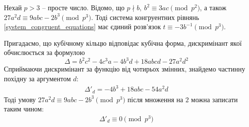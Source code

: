 \documentclass{thesis}
\begin{document}
\begin{lemma}
\label{system_when_p_is_prime_and_bigger_than_three}
Нехай $p > 3$ -- просте число. Відомо, що $p \nmid b,\ b^2 \equiv 3ac \pmod {p^2}$, а також $27a^2d \equiv 9abc - 2b^3 \pmod {p^3}$. Тоді система конгруентних рівнянь \eqref{system_congruent_equations} має єдиний розв'язок $t \equiv -3 b^{-1} \pmod {p^3}$.
\end{lemma}

Пригадаємо, що кубічному кільцю відповідає кубічна форма, дискримінант якої обчислюється за формулою
\begin{equation}
\Delta = b^2 c^2 - 4c^3 a - 4 b^3 d + 18 abcd - 27a^2d^2
\end{equation}
Сприймаючи дискримінант за функцію від чотирьох змінних, знайдемо частинну похідну за аргументом $d$:
\begin{align*}
\Delta'_d = -4b^3 + 18 abc - 54a^2 d
\end{align*}
Тоді умову $27a^2d \equiv 9abc - 2b^3 \pmod {p^3}$ після множення на $2$ можна записати таким чином:
\begin{align*}
\Delta'_d \equiv 0 \pmod {p^3}
\end{align*}

\iffalse
Розпишемо матриці $[\omega_1],\ [\omega_2]$ оператора множення. Для множення на $\omega_1$ маємо
\begin{align*}
\omega_1 \cdot 1 = \omega_1 = 0 \cdot 1 + 1 \cdot \omega_1 + 0 \cdot \omega_2 \\
\omega_1 \cdot \omega_1 = -ac + b \omega_1 + a \omega_2 \\
\omega_1 \cdot \omega_2 = ad = ad \cdot 1 + 0 \cdot \omega_1 + 0 \cdot \omega_2
\end{align*}
Водночас для множення на $\omega_2$ маємо
\begin{align*}
\omega_2 \cdot 1 = \omega_2 = 0 \cdot 1 + 0 \cdot \omega_1 + 1 \cdot \omega_2 \\
\omega_2 \cdot \omega_1 = ad = ad \cdot 1 + 0 \cdot \omega_1 + 0 \cdot \omega_2 \\
\omega_2 \cdot \omega_2 = -bd + d \omega_1 + c 
\end{align*}
Звідси отримуємо матриці
\begin{align*}
[\omega_1] = \begin{pmatrix}
0 & -ac & ad \\
1 & b & 0 \\
0 & a & 0
\end{pmatrix},\quad [\omega_2] = \begin{pmatrix}
0 & ad & -bd \\
0 & 0 & d \\
1 & 0 & c
\end{pmatrix}
\end{align*}
\fi
\end{document}

